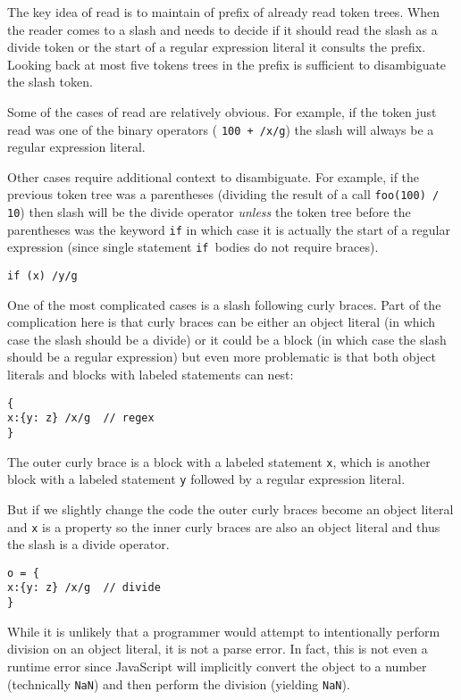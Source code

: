 \documentclass[preprint,10pt]{sigplanconf}
\begin{document}
The key idea of read is to maintain of prefix of already read token
trees. When the reader comes to a slash and needs to decide if it
should read the slash as a divide token or the start of a regular
expression literal it consults the prefix. Looking back at most five
tokens trees in the prefix is sufficient to disambiguate the slash
token.

Some of the cases of read are relatively obvious. For example, if the
token just read was one of the binary operators (\eg
\lstinline!100 + /x/g!) the slash will always be a regular expression
literal. 

Other cases require additional context to disambiguate. For example,
if the previous token tree was a parentheses (\eg dividing the result
of a call \lstinline!foo(100) / 10!) then slash will be the divide
operator \emph{unless} the token tree before the parentheses was the
keyword \texttt{if} in which case it is actually the start of a
regular expression (since single statement \texttt{if }bodies do not require
braces).

\begin{lstlisting}
if (x) /y/g  
\end{lstlisting}

One of the most complicated cases is a slash following curly braces.
Part of the  complication here is that curly braces can be either an object
literal (in which case the slash should be a divide) or it could be a
block (in which case the slash should be a regular expression) but
even more problematic is that both object literals and blocks with
labeled statements can nest:

\begin{lstlisting}
{
x:{y: z} /x/g  // regex
}
\end{lstlisting}

The outer curly brace is a block with a labeled statement
\lstinline!x!, which is another block with a labeled statement
\lstinline!y! followed by a regular expression literal.

But if we slightly change the code the outer curly braces become an
object literal and \lstinline!x! is a property so the inner curly
braces are also an object literal and thus the slash is a divide operator.

\begin{lstlisting}
o = {
x:{y: z} /x/g  // divide
}
\end{lstlisting}

While it is unlikely that a programmer would attempt to intentionally
perform division on an object literal, it is not a parse error. In
fact, this is not even a runtime error since JavaScript will
implicitly convert the object to a number (technically
\lstinline!NaN!) and then perform the division (yielding
\lstinline!NaN!).
\end{document}
